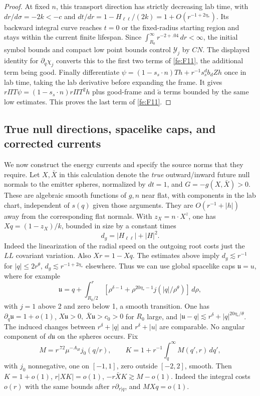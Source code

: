 \begin{proof}
At fixed $n$, this transport direction has strictly decreasing lab time, with
$dr/d\sigma=-2k<-c$ and
$dt/dr=1-H_{\ell\ell}/(2k)=1+O(r^{-1+2\eta_*})$.
Its backward integral curve reaches $t=0$ or the fixed-radius starting region
and stays within the current finite lifespan.
Since $\int_{R_0}^{\infty}r^{-2+.04}\,dr<\infty$, the initial symbol bounds
and compact low point bounds control $\mathcal Y_j$ by $CN$.
The displayed identity for $\partial_q\chi_j$ converts this to the first
two terms of \eqref{fe:F11}, the additional term being good.
Finally differentiate
$\psi=(1-s_s\cdot n)Th+r^{-1}s_s^db_dZh$ once in lab time, taking the
lab derivative before expanding the frame.  It gives
$r\Pi T\psi=(1-s_s\cdot n)r\Pi T^2h$ plus good-frame and
$\widetilde a$ terms bounded by the same low estimates.
This proves the last term of \eqref{fe:F11}.
\end{proof}

\subsection{True null directions, spacelike caps, and corrected currents}\label{fe:currents}

We now construct the energy currents and specify the source norms that they require. Let \(X,\bar X\) in this calculation denote the \emph{true} outward/inward future null normals to the emitter spheres, normalized by \(dt=1\), and \(G=-g(X,\bar X)>0\). These are algebraic smooth functions of \(g,n\) near flat, with components in the lab chart, independent of \(s(q)\) given those arguments. They are \(O(r^{-1}+|h|)\) away from the corresponding flat normals. With \(z_X=n\cdot X^z\), one has \(Xq=(1-z_X)/k\), bounded in size by a constant times
\begin{equation*}
d_g=|H_{\ell\ell}|+|H|^2.
\end{equation*}
Indeed the linearization of the radial speed on the outgoing root costs just the \(L L\) covariant variation. Also \(Xr=1-Xq\). The estimates above imply \(d_g\lesssim r^{-1}\) for \(|q|\le 2r^\theta\), \(d_g\lesssim r^{-1+2\eta_*}\) elsewhere. Thus we can use global spacelike caps \(\mathfrak u=u\), where for example
\begin{equation*}
\mathfrak u=q+\int_{R_0/2}^r
       [\rho^{\delta-1}+\rho^{20\eta_*-1}j(|q|/\rho^\theta)]\,d\rho ,
\end{equation*}
with \(j=1\) above 2 and zero below 1, a smooth transition. One has \(\partial_q\mathfrak u=1+o(1)\), \(X\mathfrak u>0,\ \bar X\mathfrak u>c_0>0\) for \(R_0\) large, and \(|\mathfrak u-q|\lesssim r^\delta+|q|^{20\eta_*/\theta}\). The induced changes between \(r^\delta+|q|\) and \(r^\delta+|u|\) are comparable. No angular component of \(d\mathfrak u\) on the spheres occurs. Fix
\begin{equation*}
M=r^{.72}\mu^{-A_H}j_0(q/r),\qquad K=1+r^{-1}\int_q^\infty M(q',r)\,dq',
\end{equation*}
with \(j_0\) nonnegative, one on \([-1,1]\), zero outside \([-2,2]\), smooth. Then \(K=1+o(1)\), \(r|XK|=o(1)\), \(-r\bar X K\gtrsim M-o(1)\). Indeed the integral costs \(o(r)\) with the same bounds after \(r\partial_{r|q}\), and \(M Xq=o(1)\).

